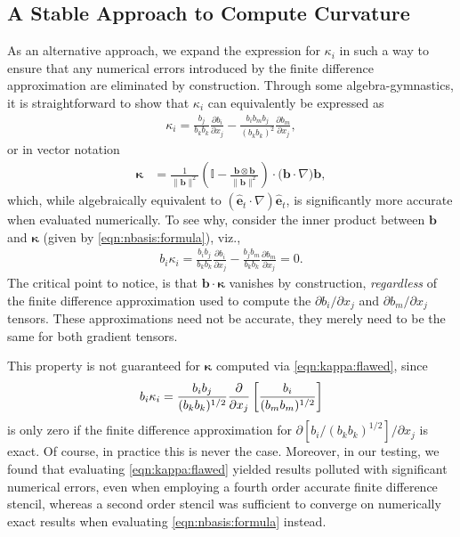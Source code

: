 \documentclass[12pt,twoside]{extreport}
\newcommand{\rbrac}[1]{\left( #1 \right)} %
\newcommand{\sbrac}[1]{\left[ #1 \right]} %
\newcommand{\mVector}[1]{\bm{#1}} %
\newcommand{\mVectorBase}[1]{\hat{\mVector{e}}_{#1}} %
\newcommand{\mTensor}[1]{\mathbb{#1}} %
\newcommand{\mpp}[1]{\partial #1}
\newcommand{\viz}{viz.,\xspace} %
\begin{document}
\subsection{A Stable Approach to Compute Curvature}
\label{app:kappa:stencil}

As an alternative approach, we expand the expression for $\kappa_i$ in such a way to ensure that any numerical errors introduced by the finite difference approximation are eliminated by construction. Through some algebra-gymnastics, it is straightforward to show that $\kappa_i$ can equivalently be expressed as
\begin{align}
    \kappa_i
        = \frac{b_j}{b_k b_k} \frac{\mpp b_i}{\mpp x_j}
            - \frac{b_i b_m  b_j}{(b_k b_k)^2}\frac{\mpp b_m}{\mpp x_j} ,
    \label{eqn:nbasis:formula}
\end{align}
or in vector notation
\begin{align}
    \mVector{\kappa}
        &= \frac{1}{\|\mVector{b}\|^2} \rbrac{\mTensor{I} - \frac{\mVector{b}\otimes\mVector{b}}{\|\mVector{b}\|^2}} \cdot \big(\mVector{b}\cdot\nabla\big)\mVector{b}
        ,
\end{align}
which, while algebraically equivalent to $(\mVectorBase{t}\cdot\nabla)\mVectorBase{t}$, is significantly more accurate when evaluated numerically. To see why, consider the inner product between $\mVector{b}$ and $\mVector{\kappa}$ (given by \autoref{eqn:nbasis:formula}), \viz
\begin{align}
    b_i \kappa_i
        = \frac{b_i b_j}{b_k b_k} \frac{\mpp b_i}{\mpp x_j}
            - \frac{b_j b_m}{b_k b_k}\frac{\mpp b_m}{\mpp x_j} = 0
    .
\end{align}
The critical point to notice, is that $\mVector{b}\cdot\mVector{\kappa}$ vanishes by construction, \textit{regardless} of the finite difference approximation used to compute the $\mpp b_i/\mpp x_j$ and $\mpp b_m/\mpp x_j$ tensors. These approximations need not be accurate, they merely need to be the same for both gradient tensors.

This property is not guaranteed for $\mVector{\kappa}$ computed via \autoref{eqn:kappa:flawed}, since
\begin{align}
    b_i \kappa_i
        = \frac{b_i b_j}{(b_k b_k)^{1/2}} \frac{\mpp}{\mpp x_j}\sbrac{\frac{b_i}{(b_m b_m)^{1/2}}}
\end{align}
is only zero if the finite difference approximation for $\mpp [b_i / (b_k b_k)^{1/2}]/\mpp x_j$ is exact. Of course, in practice this is never the case. Moreover, in our testing, we found that evaluating \autoref{eqn:kappa:flawed} yielded results polluted with significant numerical errors, even when employing a fourth order accurate finite difference stencil, whereas a second order stencil was sufficient to converge on numerically exact results when evaluating \autoref{eqn:nbasis:formula} instead.
\end{document}
